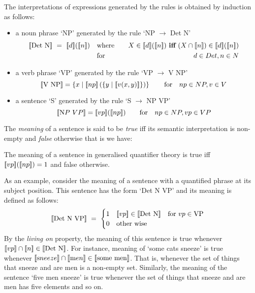 \noindent
The interpretations of  expressions generated by the rules is obtained  by induction as follows:

\begin{itemize}
\item a noun phrase `NP' generated by the rule  `NP $\to$ Det N'  
\begin{eqnarray*}
\semantics{\mbox{Det N}} \ = \  \semantics{d}(\semantics{n})  
&\quad\text{where} \quad&  X \in \semantics{d}(\semantics{n}) \ \text{\bf iff} \ (X \cap \semantics{n}) \in \semantics{d}(\semantics{n})\\
&\quad \text{for} \quad&  d \in Det,  n \in N 
\end{eqnarray*}
\item a verb phrase `VP' generated by the rule `VP $\to$ V NP' 
\[
[\![ \mbox{V NP} ]\!] = \left\{x \mid [\![ np ]\!]\left(\{y \mid [\![ v( x, y) ]\!]\}\right)\right\} \qquad
 \text{for} \quad  np \in NP,  v \in V  
\]
\item a sentence `S' generated by the rule `S $\to$ NP VP'
\[
[\![ \text NP \ VP ]\!] = [\![ vp ]\!]([\![ np ]\!]) \qquad
 \text{for} \quad  np \in NP,  vp \in VP
\]
\end{itemize}

The \emph{meaning} of a sentence   is  said to be  \emph{true} iff its semantic interpretation is non-empty and \emph{false} otherwise that is we have:
\begin{definition}
The meaning of a sentence in generalised quantifier theory is true  iff $[\![ vp ]\!]([\![ np ]\!]) = 1$ and false otherwise. 
\end{definition}

As an example, consider the  meaning of a sentence with a quantified phrase at its subject position. This sentence has the form  `Det N VP'  and its meaning is defined as follows:
\[
[\![ \mbox{Det N VP} ]\!] \ = \ \begin{cases} 1 & [\![ vp ]\!] \in [\![ \mbox{Det N} ]\!]  \quad \text{for} \ vp \in \text{VP}\\
0 & \mbox{other wise}
\end{cases}
\]
By the \emph{living on} property, the meaning of this sentence is true whenever  $[\![ vp ]\!] \cap [\![ n ]\!] \in [\![ \mbox{Det N} ]\!]$. For instance, meaning of `some cats sneeze' is true whenever $[\![ \text sneeze ]\!] \cap [\![ \text men ]\!] \in [\![ \mbox{some men} ]\!]$. That is, whenever the set of things that sneeze and are men is a non-empty set. Similarly, the meaning of the  sentence `five men sneeze' is true whenever the set of things that sneeze and are men has five elements and so on.  

